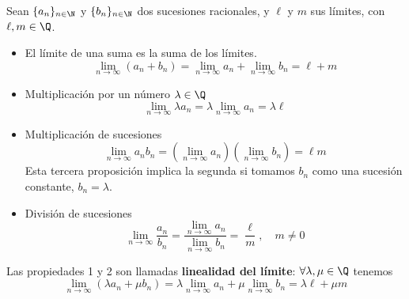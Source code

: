 \begin{proposition}
    Sean $\{a_n\}_{n\in\N} $ y $\{b_n\}_{n\in\N} $ dos sucesiones racionales, y $\ell$ y $m$ sus límites, con $\ell, m\in\Q$.
    \begin{itemize}
        \item El límite de una suma es la suma de los límites.
        \begin{equation}
            \lim_{n\to\infty}\left( a_n + b_n \right) = \lim_{n\to\infty}a_n + \lim_{n\to\infty}b_n = \ell + m
        \end{equation}
        \item Multiplicación por un número $\lambda\in\Q$
            \begin{equation}
                \lim_{n\to\infty}\lambda  a_n = \lambda \lim_{n\to\infty}a_n = \lambda\ell
            \end{equation}
        \item Multiplicación de sucesiones
            \begin{equation}
                \lim_{n\to\infty}a_nb_n = \left( \lim_{n\to\infty} a_n\right) \left( \lim_{n\to\infty}b_n \right) = \ell m
            \end{equation}
            Esta tercera proposición implica la segunda si tomamos $b_n$ como una sucesión constante, $b_n = \lambda$.
        \item División de sucesiones
            \begin{equation}
                \lim_{n\to\infty} \frac{a_n}{b_n} = \frac{\lim_{n\to\infty} a_n}{\lim_{n\to\infty}b_n} = \frac{\ell}{m},\quad m\neq 0
            \end{equation}
    \end{itemize}
    Las propiedades 1 y 2 son llamadas \textbf{linealidad del límite}: $\forall\lambda, \mu\in\Q$ tenemos
    \begin{equation}
        \lim_{n\to\infty}\left( \lambda a_n + \mu b_n \right) = \lambda \lim_{n\to\infty}a_n + \mu\lim_{n\to\infty}b_n = \lambda\ell + \mu m
    \end{equation}
\end{proposition}

